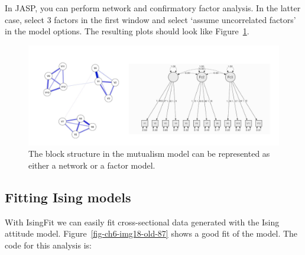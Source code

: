 \documentclass[
  a4paper,
  DIV=11,
  numbers=noendperiod,
  oneside]{scrreprt}
\begin{document}
In JASP, you can perform network and confirmatory factor analysis. In
the latter case, select 3 factors in the first window and select `assume
uncorrelated factors' in the model options. The resulting plots should
look like Figure~\ref{fig-ch6-img17-old-86}.

\begin{figure}

{\centering \includegraphics{media/ch6/image17.jpg}

}

\caption{\label{fig-ch6-img17-old-86}The block structure in the
mutualism model can be represented as either a network or a factor
model.}

\end{figure}

\hypertarget{sec-Fitting-Ising-models}{%
\subsection{Fitting Ising models}\label{sec-Fitting-Ising-models}}

With IsingFit we can easily fit cross-sectional data generated with the
Ising attitude model. Figure~\ref{fig-ch6-img18-old-87} shows a good fit
of the model. The code for this analysis is:
\end{document}
